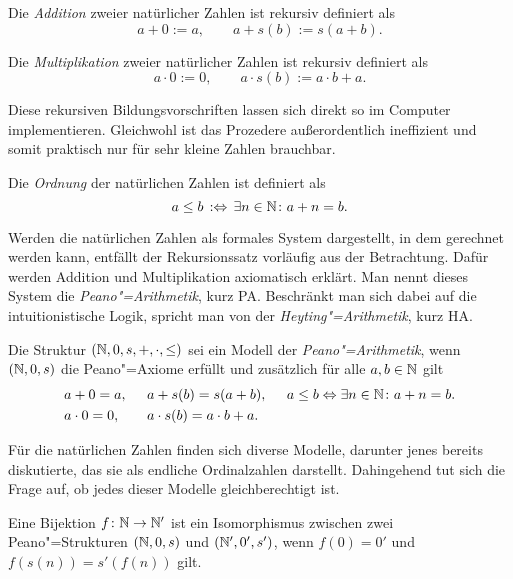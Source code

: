 \begin{Definition}%
\label{def:N-Addition}\newlinefirst
Die \emph{Addition} zweier natürlicher Zahlen ist rekursiv definiert als
\[a+0 := a,\qquad a+s(b) := s(a+b).\]
\end{Definition}
\begin{Definition}\newlinefirst
Die \emph{Multiplikation} zweier natürlicher Zahlen ist rekursiv definiert als
\[a\cdot 0 := 0,\qquad a\cdot s(b) := a\cdot b + a.\]
\end{Definition}

\noindent
Diese rekursiven Bildungsvorschriften lassen sich direkt so im Computer
implementieren. Gleichwohl ist das Prozedere außerordentlich
ineffizient und somit praktisch nur für sehr kleine Zahlen brauchbar.

\begin{Definition}\newlinefirst
Die \emph{Ordnung} der natürlichen Zahlen ist definiert als
\[a\le b\,:\Leftrightarrow\,\exists n\in\mathbb N\colon a+n = b.\]
\end{Definition}

\noindent
Werden die natürlichen Zahlen als formales System dargestellt, in dem
gerechnet werden kann, entfällt der Rekursionssatz vorläufig aus der
Betrachtung. Dafür werden Addition und Multiplikation axiomatisch erklärt.
Man nennt dieses System die \emph{Peano"=Arithmetik}, kurz PA. Beschränkt
man sich dabei auf die intuitionistische Logik, spricht man von der
\emph{Heyting"=Arithmetik}, kurz HA.
\begin{Definition}\newlinefirst
Die Struktur $(\mathbb N,0,s,+,\cdot,\le)$ sei ein Modell der
\emph{Peano"=Arithmetik}, wenn $(\mathbb N,0,s)$ die Peano"=Axiome
erfüllt und zusätzlich für alle $a,b\in\mathbb N$ gilt
\[\begin{array}{@{}l@{\quad\;\;}l@{\quad\;\;}l@{}}
a+0 = a, & a+s(b) = s(a+b), &
a\le b \bicond \exists n\in\N\colon a+n = b.\\[3pt]
a\cdot 0 = 0, & a\cdot s(b) = a\cdot b + a.
\end{array}\]
\end{Definition}

\noindent
Für die natürlichen Zahlen finden sich diverse Modelle, darunter jenes
bereits diskutierte, das sie als endliche Ordinalzahlen darstellt.
Dahingehend tut sich die Frage auf, ob jedes dieser Modelle
gleichberechtigt ist.

\begin{Definition}%
\label{def:Isomorphismus-Peano}\newlinefirst
Eine Bijektion $f\colon\mathbb N\to\mathbb N'$ ist ein Isomorphismus zwischen
zwei Peano"=Strukturen $(\mathbb N,0,s)$ und $(\mathbb N',0',s')$, wenn
$f(0)=0'$ und $f(s(n))=s'(f(n))$ gilt.
\end{Definition}

